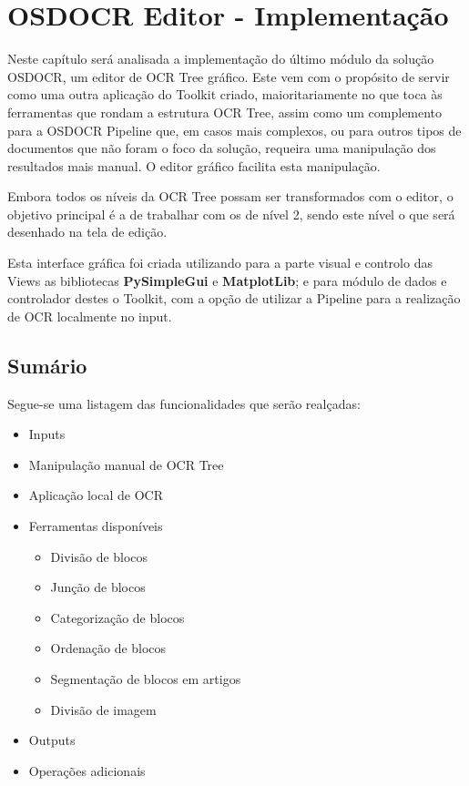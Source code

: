 \chapter{OSDOCR Editor - Implementação}
\label{cap_osdocr_editor_implementacao}



Neste capítulo será analisada a implementação do último módulo da solução OSDOCR, um editor de OCR Tree gráfico. Este vem com o propósito de servir como uma outra aplicação do Toolkit criado, maioritariamente no que toca às ferramentas que rondam a estrutura OCR Tree, assim como um complemento para a OSDOCR Pipeline que, em casos mais complexos, ou para outros tipos de documentos que não foram o foco da solução, requeira uma manipulação dos resultados mais manual. O editor gráfico facilita esta manipulação.

Embora todos os níveis da OCR Tree possam ser transformados com o editor, o objetivo principal é a de trabalhar com os de nível 2, sendo este nível o que será desenhado na tela de edição.

Esta interface gráfica foi criada utilizando para a parte visual e controlo das Views as bibliotecas \textbf{PySimpleGui} e \textbf{MatplotLib}; e para módulo de dados e controlador destes o Toolkit, com a opção de utilizar a Pipeline para a realização de OCR localmente no input.


\section{Sumário}

Segue-se uma listagem das funcionalidades que serão realçadas:

\begin{itemize}\setlength\itemsep{-0.9em}
	\item Inputs
	\item Manipulação manual de OCR Tree 
	\item Aplicação local de OCR
	\item Ferramentas disponíveis
	\begin{itemize}\setlength\itemsep{-0.9em}
			\vspace{-1em}
			\item Divisão de blocos
			\item Junção de blocos
			\item Categorização de blocos
			\item Ordenação de blocos
			\item Segmentação de blocos em artigos
			\item Divisão de imagem
		\end{itemize}
	\item Outputs
	\item Operações adicionais
\end{itemize}

